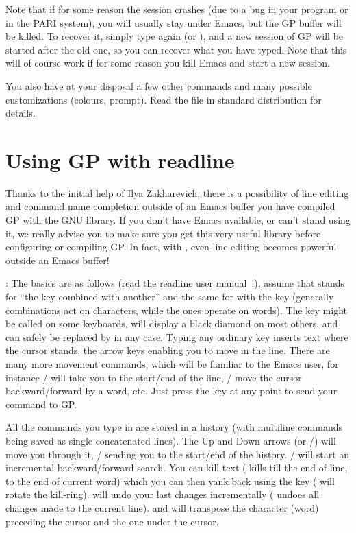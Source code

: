 Note that if for some reason the session crashes (due to a bug in your
program or in the PARI system), you will usually stay under Emacs, but the GP
buffer will be killed. To recover it, simply type again  (or
), and a new session of GP will be started after the old one,
so you can recover what you have typed. Note that this will of course
 work if for some reason you kill Emacs and start a new session.

\smallskip
You also have at your disposal a few other commands and many possible
customizations (colours, prompt). Read the file  in
standard distribution for details.


\section{Using GP with readline}

  Thanks to the initial help of Ilya Zakharevich, there is a possibility of
line editing and command name completion outside of an Emacs buffer
 you have compiled GP with the GNU  library. If you
don't have Emacs available, or can't stand using it, we really advise you
to make sure you get this very useful library before configuring or
compiling GP. In fact, with , even line editing becomes
 powerful outside an Emacs buffer!

:
\label{se:readline}
  The basics are as follows (read the readline user manual~!), assume that
 stands for ``the  key combined with another'' and the
same for  with the  key (generally  combinations
act on characters, while the  ones operate on words). The 
key might be called  on some keyboards, will display a black diamond
on most others, and can safely be replaced by  in any case. Typing
any ordinary key inserts text where the cursor stands, the arrow keys
enabling you to move in the line. There are many more movement commands,
which will be familiar to the Emacs user, for instance /
will take you to the start/end of the line, / move the
cursor backward/forward by a word, etc. Just press the  key at
any point to send your command to GP.

  All the commands you type in are stored in a history (with multiline
commands being saved as single concatenated lines). The Up and Down arrows (or
/) will move you through it, / sending
you to the start/end of the history. / will start an
incremental backward/forward search. You can kill text ( kills till
the end of line,  to the end of current word) which you can then
yank back using the  key ( will rotate the kill-ring).
 will undo your last changes incrementally ( undoes all
changes made to the current line).  and  will transpose
the character (word) preceding the cursor and the one under the cursor.

